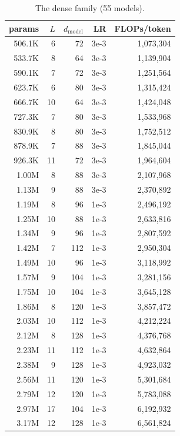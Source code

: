\documentclass[10pt]{article}
\begin{document}
\begin{table}[h]
\begin{tabular}{rrrrr}
\toprule
params & $L$ & $d_{\mathrm{model}}$ & LR & FLOPs/token \\
\midrule
506.1K & 6 & 72 & 3e-3 & 1{,}073{,}304 \\
533.7K & 8 & 64 & 3e-3 & 1{,}139{,}904 \\
590.1K & 7 & 72 & 3e-3 & 1{,}251{,}564 \\
623.7K & 6 & 80 & 3e-3 & 1{,}315{,}424 \\
666.7K & 10 & 64 & 3e-3 & 1{,}424{,}048 \\
727.3K & 7 & 80 & 3e-3 & 1{,}533{,}968 \\
830.9K & 8 & 80 & 3e-3 & 1{,}752{,}512 \\
878.9K & 7 & 88 & 3e-3 & 1{,}845{,}044 \\
926.3K & 11 & 72 & 3e-3 & 1{,}964{,}604 \\
1.00M & 8 & 88 & 3e-3 & 2{,}107{,}968 \\
1.13M & 9 & 88 & 3e-3 & 2{,}370{,}892 \\
1.19M & 8 & 96 & 1e-3 & 2{,}496{,}192 \\
1.25M & 10 & 88 & 1e-3 & 2{,}633{,}816 \\
1.34M & 9 & 96 & 1e-3 & 2{,}807{,}592 \\
1.42M & 7 & 112 & 1e-3 & 2{,}950{,}304 \\
1.49M & 10 & 96 & 1e-3 & 3{,}118{,}992 \\
1.57M & 9 & 104 & 1e-3 & 3{,}281{,}156 \\
1.75M & 10 & 104 & 1e-3 & 3{,}645{,}128 \\
1.86M & 8 & 120 & 1e-3 & 3{,}857{,}472 \\
2.03M & 10 & 112 & 1e-3 & 4{,}212{,}224 \\
2.12M & 8 & 128 & 1e-3 & 4{,}376{,}768 \\
2.23M & 11 & 112 & 1e-3 & 4{,}632{,}864 \\
2.38M & 9 & 128 & 1e-3 & 4{,}923{,}032 \\
2.56M & 11 & 120 & 1e-3 & 5{,}301{,}684 \\
2.79M & 12 & 120 & 1e-3 & 5{,}783{,}088 \\
2.97M & 17 & 104 & 1e-3 & 6{,}192{,}932 \\
3.17M & 12 & 128 & 1e-3 & 6{,}561{,}824 \\
\bottomrule
\end{tabular}
\caption{The dense family (55 models).}
\label{tab:zoo-dense}
\end{table}
\end{document}
